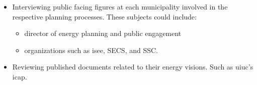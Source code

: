 \begin{enumerate}
\begin{itemize}
\begin{itemize}
            \item Interviewing public facing figures at each municipality
            involved in the respective planning processes. These subjects could
            include:
            \begin{itemize}
                \item director of energy planning and public engagement
                \item organizations such as \ac{isee}, SECS, and SSC. 
            \end{itemize}
            \item Reviewing published documents related to their energy visions.
            Such as \ac{uiuc}'s \ac{icap}.
        \end{itemize}
        
    \end{itemize}
\end{enumerate}